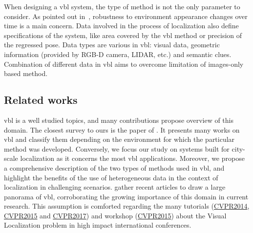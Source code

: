 		When designing a \ac{vbl} system, the type of method is not the only parameter to consider. As pointed out in~\citep{Lowry2016}, robustness to environment appearance changes over time is a main concern. Data involved in the process of localization also define specifications of the system, like area covered by the \ac{vbl} method or precision of the regressed pose.  Data types are various in \ac{vbl}: visual data, geometric information (provided by RGB-D camera, LIDAR, etc.) and semantic clues. Combination of different data in \ac{vbl} aims to overcome limitation of images-only based method.
		
	\subsection{Related works} 
    	\ac{vbl} is a well studied topics, and many contributions propose overview of this domain. The closest survey to ours is the paper of \citet{Brejcha2017}. It presents many works on \ac{vbl} and classify them depending on the environment for which the particular method was developed. Conversely, we focus our study on systems built for city-scale localization as it concerns the most \ac{vbl} applications. Moreover, we propose a comprehensive description of the two types of methods used in \ac{vbl}, and highlight the benefits of the use of heterogeneous data in the context of localization in challenging scenarios. \citet{Zamir2016} gather recent articles to draw a large panorama of \ac{vbl}, corroborating the growing importance of this domain in current research. This assumption is comforted regarding the many tutorials (\href{https://sites.google.com/site/lsvpr2014/}{CVPR2014}, \href{https://roboticvision.atlassian.net/wiki/display/PUB/CVPR+2015+Workshop+on+Visual+Place+Recognition+in+Changing+Environments}{CVPR2015} and \href{https://sites.google.com/view/lsvpr2017/home}{CVPR2017}) and workshop (\href{https://roboticvision.atlassian.net/wiki/display/PUB/CVPR+2015+Workshop+on+Visual+Place+Recognition+in+Changing+Environments}{CVPR2015}) about the Visual Localization problem in high impact international conferences.
    	
